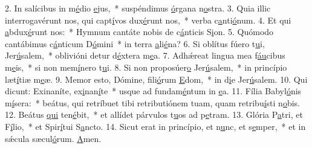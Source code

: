 2. In salícibus in m\uline{é}dio \uline{e}jus,~* suspéndimus \uline{ó}rgana n\uline{o}stra.
3. Quia illic interrogavérunt nos, qui capt\uline{í}vos dux\uline{é}runt nos,~* verba c\uline{a}nti\uline{ó}num.
4. Et qui \uline{a}bdux\uline{é}runt nos:~* Hymnum cantáte nobis de c\uline{á}nticis S\uline{i}on.
5. Quómodo cantábimus c\uline{á}nticum D\uline{ó}mini~* in terra \uline{a}li\uline{é}na?
6. Si oblítus fúero t\uline{u}i, Jer\uline{ú}salem,~* oblivióni detur d\uline{é}xtera m\uline{e}a.
7. Adhǽreat lingua mea f\uline{áu}cibus m\uline{e}is,~* si non mem\uline{í}nero t\uline{u}i.
8. Si non proposúer\uline{o} Jer\uline{ú}salem,~* in princípio læt\uline{í}tiæ m\uline{e}æ.
9. Memor esto, Dómine, fili\uline{ó}rum \uline{E}dom,~* in d\uline{i}e Jer\uline{ú}salem.
10. Qui dicunt: Exinaníte, ex\uline{i}nan\uline{í}te~* usque ad fundam\uline{é}ntum in \uline{e}a.
11. Fília Babyl\uline{ó}nis m\uline{í}sera:~* beátus, qui retríbuet tibi retributiónem tuam, quam retribu\uline{í}sti n\uline{o}bis.
12. Beátus \uline{qui} ten\uline{é}bit,~* et allídet párvulos t\uline{u}os ad p\uline{e}tram.
13. Glória P\uline{a}tri, et F\uline{í}lio,~* et Spir\uline{í}tui S\uline{a}ncto.
14. Sicut erat in princípio, et n\uline{u}nc, et s\uline{e}mper,~* et in sǽcula sæcul\uline{ó}rum. \uline{A}men.
